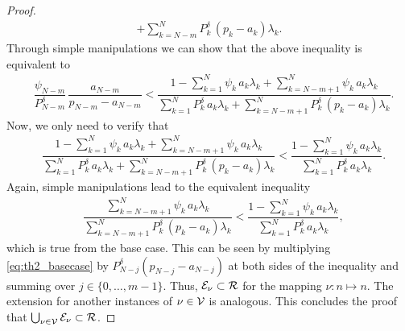 \begin{proof}
\begin{align*}
{                + \sum_{k=N-m}^{N} P_k^\delta\,(p_k-a_k)\lambda_k}.
    \end{align*}
    Through simple manipulations we can show that the above inequality is equivalent to
    \begin{align*}
        & \dfrac{\psi_{N-m}}{P_{N-m}^\delta}\,\dfrac{a_{N-m}}{p_{N-m}-a_{N-m}} < \dfrac{1 - \sum_{k=1}^{N} \psi_k\,a_k \lambda_k 
                + \sum_{k=N-m+1}^{N} \psi_k\,a_k \lambda_k}
            {\sum_{k=1}^{N} P_k^\delta\,a_k\lambda_k 
                + \sum_{k=N-m+1}^{N} P_k^\delta\,(p_k-a_k)\lambda_k}.
    \end{align*}
    Now, we only need to verify that
    \begin{align*}
    &\dfrac{1 - \sum_{k=1}^{N} \psi_k\,a_k \lambda_k 
                + \sum_{k=N-m+1}^{N} \psi_k\,a_k \lambda_k}
            {\sum_{k=1}^{N} P_k^\delta\,a_k\lambda_k 
                + \sum_{k=N-m+1}^{N} P_k^\delta\,(p_k-a_k)\lambda_k} < \dfrac{1 - \sum_{k=1}^{N} \psi_k\,a_k \lambda_k}
            {\sum_{k=1}^{N} P_k^\delta\,a_k\lambda_k}.
    \end{align*}
    Again, simple manipulations lead to the equivalent inequality
    \begin{align*}
    &\dfrac{\sum_{k=N-m+1}^{N} \psi_k\,a_k \lambda_k}
            {\sum_{k=N-m+1}^{N} P_k^\delta\,(p_k-a_k)\lambda_k}
        < \dfrac{1 - \sum_{k=1}^{N} \psi_k\,a_k \lambda_k}
            {\sum_{k=1}^{N} P_k^\delta\,a_k\lambda_k},
    \end{align*}
    which is true from the base case. This can be seen by multiplying  \eqref{eq:th2_basecase} by $P^\delta_{N-j}(p_{N-j}-a_{N-j})$ at both sides of the inequality and summing over $j\in\{0,\dots,m-1\}$. Thus, $\cal{E}_\nu \subset \cal{R}$ for the mapping $\nu: n \longmapsto n$. The extension for another instances of $\nu\in\cal{V}$ is analogous. This concludes the proof that $\bigcup_{\nu\in\cal{V}} \cal{E}_\nu \subset \cal{R}$.
    

\end{proof}
